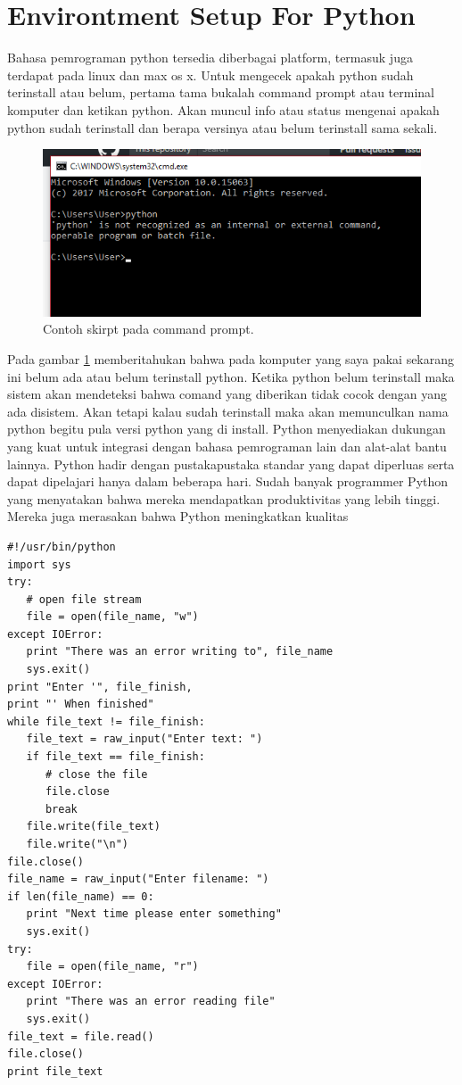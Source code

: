 \section{Environtment Setup For Python}
Bahasa pemrograman python tersedia diberbagai platform, termasuk juga terdapat pada 
linux dan max os x. Untuk mengecek apakah python sudah terinstall atau belum, pertama 
tama bukalah command prompt atau terminal komputer dan ketikan python. Akan muncul info 
atau status mengenai apakah python sudah terinstall dan berapa versinya atau belum terinstall sama sekali.
  \begin{figure}[ht]
	\centerline{\includegraphics[width=1\textwidth]{Plagiarisme/cmd.PNG}}
	\caption{Contoh skirpt pada command prompt.}
	\label{cmd}
	\end{figure}
Pada gambar \ref{cmd} memberitahukan bahwa pada komputer yang saya pakai sekarang ini belum ada atau belum terinstall python.
Ketika python belum terinstall maka sistem akan mendeteksi bahwa comand yang diberikan tidak cocok dengan yang ada disistem. 
Akan tetapi kalau sudah terinstall maka akan memunculkan nama python begitu pula versi python yang di install.
Python menyediakan dukungan yang kuat untuk integrasi dengan bahasa pemrograman lain dan alat-alat bantu lainnya. 
Python hadir dengan pustakapustaka standar yang dapat diperluas serta dapat dipelajari hanya dalam beberapa hari.
Sudah banyak programmer Python yang menyatakan bahwa mereka mendapatkan produktivitas yang lebih tinggi. 
Mereka juga merasakan bahwa Python meningkatkan kualitas 
\begin{verbatim}
#!/usr/bin/python
import sys
try:
   # open file stream
   file = open(file_name, "w")
except IOError:
   print "There was an error writing to", file_name
   sys.exit()
print "Enter '", file_finish,
print "' When finished"
while file_text != file_finish:
   file_text = raw_input("Enter text: ")
   if file_text == file_finish:
      # close the file
      file.close
      break
   file.write(file_text)
   file.write("\n")
file.close()
file_name = raw_input("Enter filename: ")
if len(file_name) == 0:
   print "Next time please enter something"
   sys.exit()
try:
   file = open(file_name, "r")
except IOError:
   print "There was an error reading file"
   sys.exit()
file_text = file.read()
file.close()
print file_text
\end{verbatim}

